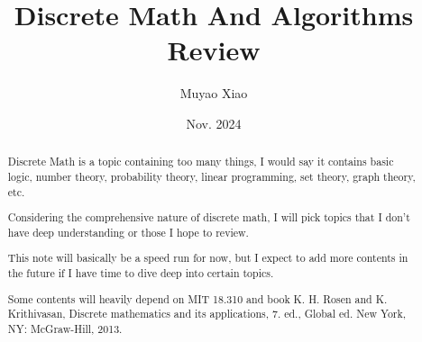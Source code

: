\documentclass[a4paper]{report}
\title{Discrete Math And Algorithms Review}
\author{Muyao Xiao}
\date{Nov. 2024}
\begin{document}
\maketitle

\begin{abstract}
    Discrete Math is a topic containing too many things, I would say it contains basic logic, number theory, probability theory, linear programming, set theory, graph theory, etc.

    Considering the comprehensive nature of discrete math, I will pick topics that I don't have deep understanding or those I hope to review. 

    This note will basically be a speed run for now, but I expect to add more contents in the future if I have time to dive deep into certain topics.

    Some contents will heavily depend on MIT 18.310 and book K. H. Rosen and K. Krithivasan, Discrete mathematics and its applications, 7. ed., Global ed. New York, NY: McGraw-Hill, 2013.
\end{abstract}

\tableofcontents


\pagestyle{plain}
\printbibliography{}
\end{document}
